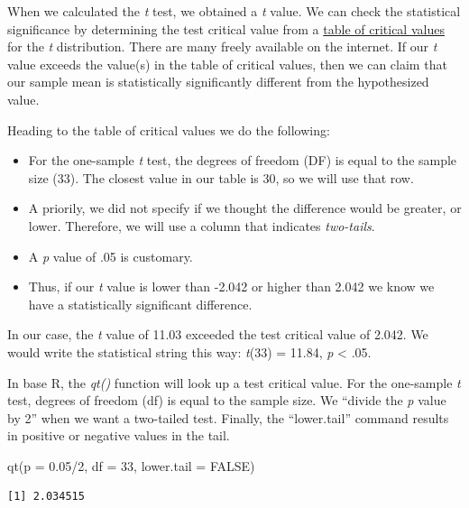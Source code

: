 \documentclass[
  11pt,
]{book}
\newenvironment{Shaded}{\begin{snugshade}}{\end{snugshade}}
\newcommand{\AttributeTok}[1]{\textcolor[rgb]{0.77,0.63,0.00}{#1}}
\newcommand{\ConstantTok}[1]{\textcolor[rgb]{0.00,0.00,0.00}{#1}}
\newcommand{\DecValTok}[1]{\textcolor[rgb]{0.00,0.00,0.81}{#1}}
\newcommand{\FloatTok}[1]{\textcolor[rgb]{0.00,0.00,0.81}{#1}}
\newcommand{\FunctionTok}[1]{\textcolor[rgb]{0.00,0.00,0.00}{#1}}
\newcommand{\NormalTok}[1]{#1}
\newcommand{\SpecialCharTok}[1]{\textcolor[rgb]{0.00,0.00,0.00}{#1}}
\providecommand{\tightlist}{%
  \setlength{\itemsep}{0pt}\setlength{\parskip}{0pt}}
\begin{document}
When we calculated the \emph{t} test, we obtained a \emph{t} value. We can check the statistical significance by determining the test critical value from a \href{https://www.statology.org/t-distribution-table/}{table of critical values} for the \emph{t} distribution. There are many freely available on the internet. If our \emph{t} value exceeds the value(s) in the table of critical values, then we can claim that our sample mean is statistically significantly different from the hypothesized value.

Heading to the table of critical values we do the following:

\begin{itemize}
\tightlist
\item
  For the one-sample \emph{t} test, the degrees of freedom (DF) is equal to the sample size (33). The closest value in our table is 30, so we will use that row.
\item
  A priorily, we did not specify if we thought the difference would be greater, or lower. Therefore, we will use a column that indicates \emph{two-tails}.
\item
  A \emph{p} value of .05 is customary.
\item
  Thus, if our \emph{t} value is lower than -2.042 or higher than 2.042 we know we have a statistically significant difference.
\end{itemize}

In our case, the \emph{t} value of 11.03 exceeded the test critical value of 2.042. We would write the statistical string this way: \emph{t}(33) = 11.84, \emph{p} \textless{} .05.

In base R, the \emph{qt()} function will look up a test critical value. For the one-sample \emph{t} test, degrees of freedom (df) is equal to the sample size. We ``divide the \emph{p} value by 2'' when we want a two-tailed test. Finally, the ``lower.tail'' command results in positive or negative values in the tail.

\begin{Shaded}
\begin{Highlighting}[]
\FunctionTok{qt}\NormalTok{(}\AttributeTok{p =} \FloatTok{0.05}\SpecialCharTok{/}\DecValTok{2}\NormalTok{, }\AttributeTok{df =} \DecValTok{33}\NormalTok{, }\AttributeTok{lower.tail =} \ConstantTok{FALSE}\NormalTok{)}
\end{Highlighting}
\end{Shaded}

\begin{verbatim}
[1] 2.034515
\end{verbatim}
\end{document}
